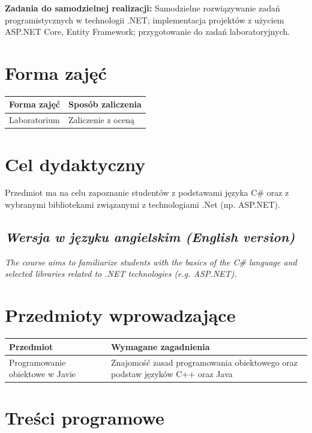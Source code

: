 \documentclass[12pt, a4paper]{article}
\begin{document}
\vspace{4pt}
\noindent\textbf{Zadania do samodzielnej realizacji:} Samodzielne rozwiązywanie zadań programistycznych w technologii .NET; implementacja projektów z użyciem ASP.NET Core, Entity Framework; przygotowanie do zadań laboratoryjnych.

\section{Forma zajęć}

\begin{tabular}{ll}
  \hline
  \textbf{Forma zajęć} & \textbf{Sposób zaliczenia} \\
  \hline
  Laboratorium & Zaliczenie z oceną \\
  \hline
\end{tabular}

\section{Cel dydaktyczny}

Przedmiot ma na celu zapoznanie studentów z podstawami języka C\# oraz z wybranymi bibliotekami związanymi z technologiami .Net (np. ASP.NET).

\subsection*{\textit{Wersja w języku angielskim (English version)}}

\textit{The course aims to familiarize students with the basics of the C\# language and selected libraries related to .NET technologies (e.g. ASP.NET).}


\section{Przedmioty wprowadzające}

\begin{tabularx}{\textwidth}{lX}
  \hline
  \textbf{Przedmiot} & \textbf{Wymagane zagadnienia} \\
  \hline
  Programowanie obiektowe w Javie & Znajomość zasad programowania obiektowego oraz podstaw języków C++ oraz Java \\
  \hline
\end{tabularx}

\section{Treści programowe}
\end{document}
